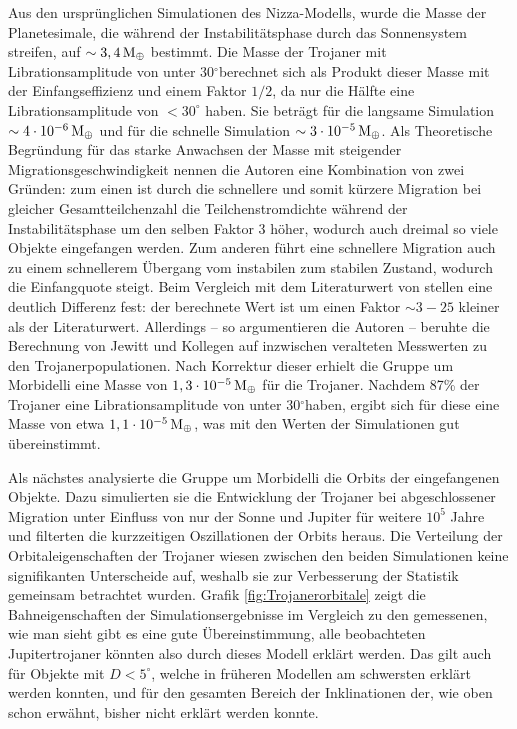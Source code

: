\documentclass[12pt,a4paper,twoside]{article}
\renewcommand{\cite}{\citep}
\newcommand{\degree}{$^\circ$}
\newcommand{\ME}{M_\oplus}
\begin{document}
Aus den ursprünglichen Simulationen des Nizza-Modells,
wurde die Masse der Planetesimale, die während der Instabilitätsphase durch das Sonnensystem streifen, auf $\sim \unit[3,4]{\ME}$ bestimmt.
Die Masse der Trojaner mit Librationsamplitude von unter 30\degree berechnet sich als Produkt dieser Masse mit der Einfangseffizienz und einem Faktor $1/2$, da nur die Hälfte eine Librationsamplitude von $<30^\circ$ haben. Sie beträgt für die langsame Simulation $\sim\unit[4\cdot 10^{-6}]{\ME}$ und für die schnelle Simulation $\sim \unit[3\cdot 10^{-5}]{\ME}$.
Als Theoretische Begründung für das starke Anwachsen der Masse mit steigender Migrationsgeschwindigkeit nennen die Autoren eine Kombination von zwei Gründen:
zum einen ist durch die schnellere und somit kürzere Migration bei gleicher Gesamt\/teilchenzahl die Teilchenstromdichte während der Instabilitätsphase um den selben Faktor 3 höher, wodurch auch dreimal so viele Objekte eingefangen werden. Zum anderen führt eine schnellere Migration auch zu einem schnellerem Übergang vom instabilen zum stabilen Zustand, wodurch die Einfangquote steigt\cite{Morbidelli2005}.
Beim Vergleich mit dem Literaturwert von \cite{Jewitt2000} stellen \cite{Morbidelli2005} eine deutlich Differenz fest: der berechnete Wert ist um einen Faktor $\sim 3-25$ kleiner als der Literaturwert.
Allerdings – so argumentieren die Autoren – beruhte die Berechnung von Jewitt und Kollegen auf inzwischen veralteten Messwerten zu den Trojanerpopulationen. %
Nach Korrektur dieser erhielt die Gruppe um Morbidelli eine Masse von $\unit[1,3 \cdot 10^{-5}]{\ME}$ für die Trojaner. Nachdem 87\% der Trojaner eine Librationsamplitude von unter 30\degree haben, ergibt sich für diese eine Masse von etwa $\unit[1,1 \cdot 10^{-5}]{\ME}$, was mit den Werten der Simulationen gut übereinstimmt\cite{Morbidelli2005}.

Als nächstes analysierte die Gruppe um Morbidelli die Orbits der eingefangenen Objekte. Dazu simulierten sie die Entwicklung der Trojaner bei abgeschlossener Migration unter Einfluss von nur der Sonne und Jupiter für weitere $10^5$ Jahre und filterten die kurzzeitigen Oszillationen der Orbits heraus.
Die Verteilung der Orbitaleigenschaften der Trojaner wiesen zwischen den beiden Simulationen keine signifikanten Unterscheide auf, weshalb sie zur Verbesserung der Statistik gemeinsam betrachtet wurden.
Grafik \ref{fig:Trojanerorbitale} zeigt die Bahneigenschaften der Simulationsergebnisse im Vergleich zu den gemessenen, wie man sieht gibt es eine gute Übereinstimmung, alle beobachteten Jupitertrojaner könnten also durch dieses Modell erklärt werden.
Das gilt auch für Objekte mit $D<5^\circ$, welche in früheren Modellen am schwersten erklärt werden konnten\cite{Marzari2002,Morbidelli2005},
und für den gesamten Bereich der Inklinationen der, wie oben schon erwähnt, bisher nicht erklärt werden konnte.
\end{document}
